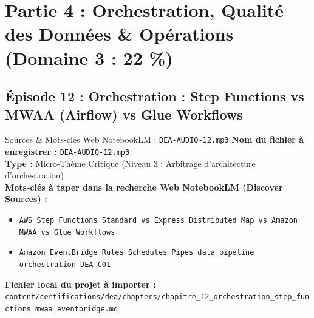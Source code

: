 \documentclass[11pt,a4paper]{article}
\begin{document}
\newpage

\section{Partie 4 : Orchestration, Qualité des Données \& Opérations (Domaine 3 : 22 \%)}

\subsection{Épisode 12 : Orchestration : Step Functions vs MWAA (Airflow) vs Glue Workflows}
\begin{sourcebox}{Sources \& Mots-clés Web NotebookLM : \texttt{DEA-AUDIO-12.mp3}}
\textbf{Nom du fichier à enregistrer :} \texttt{DEA-AUDIO-12.mp3}\\
\textbf{Type :} Micro-Thème Critique (Niveau 3 : Arbitrage d'architecture d'orchestration)\\
\textbf{Mots-clés à taper dans la recherche Web NotebookLM (Discover Sources) :}
\begin{itemize}[noitemsep]
    \item \texttt{AWS Step Functions Standard vs Express Distributed Map vs Amazon MWAA vs Glue Workflows}
    \item \texttt{Amazon EventBridge Rules Schedules Pipes data pipeline orchestration DEA-C01}
\end{itemize}
\textbf{Fichier local du projet à importer :}
\texttt{content/certifications/dea/chapters/chapitre_12_orchestration_step_functions_mwaa_eventbridge.md}
\end{sourcebox}
\end{document}

